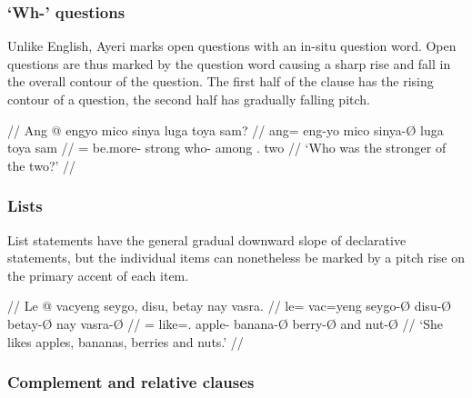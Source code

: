 \subsubsection{`Wh-' questions}

Unlike English, Ayeri marks open questions with an in-situ question word.
Open questions are thus marked by the question word causing a sharp rise and 
fall in the overall contour of the question. The first half of the clause has 
the rising contour of a question, the second half has gradually falling pitch.

\ex[belowexskip=0em]\begingl
	\glpreamble{} //
	\gla Ang @ engyo mico sinya luga toya sam? //
	\glb ang= eng-yo mico sinya-Ø luga toya sam //
	\glc \AgtT{}= be.more-\TsgN{} strong who-\Top{} among \TplN{}.\Loc{}
		two //
	\glft `Who was the stronger of the two?' //
\endgl\xe


\subsubsection{Lists}

List statements have the general gradual downward slope of declarative
statements, but the individual items can nonetheless be marked by a pitch rise
on the primary accent of each item.

\ex[belowexskip=0em]\begingl
	\glpreamble{} //
	\gla Le @ vacyeng seygo, disu, betay nay vasra. //
	\glb le= vac=yeng seygo-Ø disu-Ø betay-Ø nay vasra-Ø //
	\glc \PatTI{}= like=\TsgF{}.\Aarg{} apple-\Top{} banana-Ø berry-Ø and
		nut-Ø //
	\glft `She likes apples, bananas, berries and nuts.' //
\endgl\xe

\subsubsection{Complement and relative clauses}

